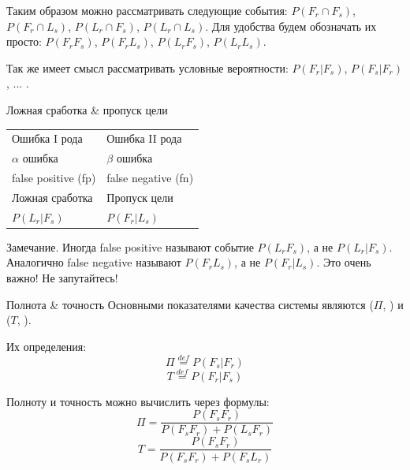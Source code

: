   \begin{frame}
  Таким образом можно рассматривать следующие события: 
  $P(F_r \cap F_s)$, $P(F_r \cap L_s)$, $P(L_r \cap F_s)$, $P(L_r \cap L_s)$. 
  Для удобства будем обозначать их просто: 
  $P(F_r  F_s)$, $P(F_r L_s)$, $P(L_r F_s)$, $P(L_r L_s)$. 
  
  Так же имеет смысл рассматривать условные вероятности: 
  $P(F_r | F_s)$, 
  $P(F_s | F_r)$, ... .
  \end{frame}

  \begin{frame}{Ложная сработка \& пропуск цели} 
  \begin{center}
		\LARGE
		\begin{tabular}{l|l}
		 	Ошибка I рода & Ошибка II рода \\
		 	$\alpha$ ошибка & $\beta$ ошибка \\
		 	false positive (fp) & false negative (fn) \\ 
		 	Ложная сработка  & Пропуск цели \\
		 	$P(L_r|F_s)$ & $P(F_r |L_s)$\\
		\end{tabular}
  \end{center}
   
    \begin{block}{Замечание.}
 	Иногда false positive называют событие $P(L_r F_s)$, а не $P(L_r | F_s)$.
 	Аналогично false negative называют $P(F_r  L_s)$, а не $P(F_r | L_s)$.
 	Это очень важно! Не запутайтесь!
    \end{block}
  \end{frame}
 
  \begin{frame}{Полнота \& точность}\label{frame:presicion_recall}
  Основными показателями качества системы являются 
   ($\Pi$, ) 
  и 
   ($T$, ).
  
  Их определения:
  \begin{equation}
  \Pi \stackrel{def}{=} P(F_s | F_r)
  \end{equation}
  \begin{equation}
  T \stackrel{def}{=} P(F_r | F_s)
  \end{equation}
  
  Полноту и точность можно вычислить через формулы:
  \begin{equation}\label{eq:recall_calc}
  \Pi = \frac{P(F_s  F_r)}{P(F_s F_r) + P(L_s F_r)}
  \end{equation}
  \begin{equation}\label{eq:precision_calc}
  T = \frac{P(F_s F_r)}{P(F_s F_r) + P(F_s L_r)}
  \end{equation}
  \end{frame}
  
